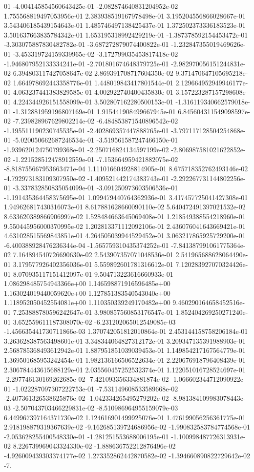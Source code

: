 01	-4.004145854560643425e-01	-2.082874640831204952e-02	1.755568819497053956e-01	2.383938519167978498e-01	3.195204556866028667e-01	3.543406185439154643e-01	1.485746497138425437e-01	1.372502373336183523e-01	3.501637663835784342e-01	1.653195318992429219e-01	-1.387378592154453472e-01	-3.303075887830482782e-01	-3.687272879074400822e-01	-1.232847355019469626e-01	-3.453319724159339965e-02	-3.172799035453817418e-02	-1.946807952133334241e-01	-2.701801674648379725e-01	-2.982970056151244831e-02	6.394803117427058647e-02	2.869391708717604350e-02	9.371470647105695218e-02	1.664978692443358776e-01	1.448019843417801544e-01	2.129664952949946177e-01	4.063237441383829585e-01	4.002922740400435830e-01	3.157223287157298608e-01	4.224344926151558099e-01	3.502807162280500153e-01	-1.316119340662579018e-01	-1.312881959196807169e-01	1.915441908499667945e-01	6.845604311549098597e-02	-7.239828967629802214e-02	-6.484853871540896542e-02	-1.195511190230745535e-01	-2.402869357447888765e-01	-3.797117128504254868e-01	-5.020050662687246534e-01	-3.519561587247466150e-01	-1.939620124750799368e-01	-2.250716824134597199e-02	-2.806987581021622852e-02	-1.221528512478912559e-01	-7.153664959421882075e-02	-8.818755667953663471e-04	1.111016604928814905e-01	8.675718352762493146e-02	-4.792973183109307950e-02	-1.409521442174383743e-01	-2.292267731144802256e-01	-3.337832850835054099e-01	-3.091250973603506536e-01	-1.191435364458375695e-01	1.099479440764362936e-01	3.417457725041427308e-01	1.949626817430316073e-01	8.617881628660090110e-02	5.640472491397021532e-02	8.633620389866906997e-02	1.528484663645069408e-01	1.218549388554218960e-01	9.550445956000370995e-02	1.202813371112092106e-01	2.436076041643669421e-01	4.631028515569843851e-01	4.264505039944529452e-01	3.063217865925729200e-01	-6.400388928476236344e-04	-1.565759310435374252e-01	-7.841387991061775364e-02	7.164894540726690630e-02	2.543907357071048536e-01	2.541965688628064490e-01	3.179577926402356036e-01	5.559892601781316612e-01	7.120283927070324426e-01	8.070935117151412097e-01	9.504713223616660933e-01	1.086298485754943366e+00	1.146598871916596485e+00	1.163024019440059620e+00	1.127851383540543040e+00	1.118952050452554081e+00	1.110350339249170482e+00	9.460290164658452516e-01	7.253888780596242647e-01	3.980857560853176547e-01	1.852404269250271240e-01	3.652559611187308070e-02	-6.231202065012549085e-03	-1.456635441730711866e-03	1.370742051812010864e-01	2.453144158758206184e-01	3.263628387563498601e-01	3.348344064827312172e-01	3.209347135391988903e-01	2.568785368493612942e-01	1.887951851039039453e-01	1.149854217167564779e-01	1.369501685953242454e-01	1.982136166506522634e-01	2.220676918796408439e-01	2.306784443615688129e-01	2.035560457252532374e-01	1.122051016728524697e-01	-2.297746130169262685e-02	-7.421093356334881874e-02	-1.066602344712090922e-01	-1.022287097307222753e-01	-7.531149608533589668e-02	-2.407361326538625876e-02	-1.042334265495279202e-02	-8.981384109983078443e-03	-2.507043703466229831e-02	-8.510986964955159079e-03	6.449967397164371730e-02	1.124616901499925076e-01	1.476199056256361775e-01	2.918198879319367639e-02	-9.162685139724686956e-02	-1.990832583784774568e-01	-2.053628255400548330e-01	-1.281251553688006195e-01	-1.100998487726313931e-02	8.226739969043324330e-02	-1.888636752212876496e-02	-4.926009439303374177e-02	1.273352862442870582e-02	-1.394660890822729642e-02	-7.